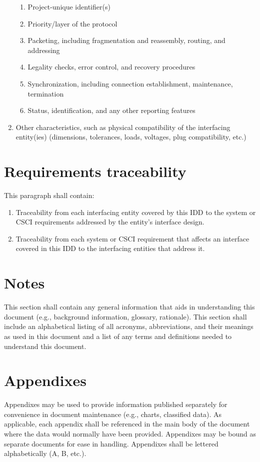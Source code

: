 \documentclass{fidata-report-template}
\begin{document}
\begin{enumerate}
  \begin{enumerate}
  \itemsep1pt\parskip0pt
  \item
    Project-unique identifier(s)
  \item
    Priority/layer of the protocol
  \item
    Packeting, including fragmentation and reassembly, routing, and
    addressing
  \item
    Legality checks, error control, and recovery procedures
  \item
    Synchronization, including connection establishment, maintenance,
    termination
  \item
    Status, identification, and any other reporting features
  \end{enumerate}
\item
  Other characteristics, such as physical compatibility of the
  interfacing entity(ies) (dimensions, tolerances, loads, voltages, plug
  compatibility, etc.)
\end{enumerate}

\section{Requirements traceability}

This paragraph shall contain:

\begin{enumerate}
\itemsep1pt\parskip0pt
\item
  Traceability from each interfacing entity covered by this IDD to the
  system or CSCI requirements addressed by the entity's interface
  design.
\item
  Traceability from each system or CSCI requirement that affects an
  interface covered in this IDD to the interfacing entities that address
  it.
\end{enumerate}

\section{Notes}

This section shall contain any general information that aids in
understanding this document (e.g., background information, glossary,
rationale). This section shall include an alphabetical listing of all
acronyms, abbreviations, and their meanings as used in this document and
a list of any terms and definitions needed to understand this document.

\appendix

\section{Appendixes}

Appendixes may be used to provide information published separately for
convenience in document maintenance (e.g., charts, classified data). As
applicable, each appendix shall be referenced in the main body of the
document where the data would normally have been provided. Appendixes
may be bound as separate documents for ease in handling. Appendixes
shall be lettered alphabetically (A, B, etc.).
\end{document}
